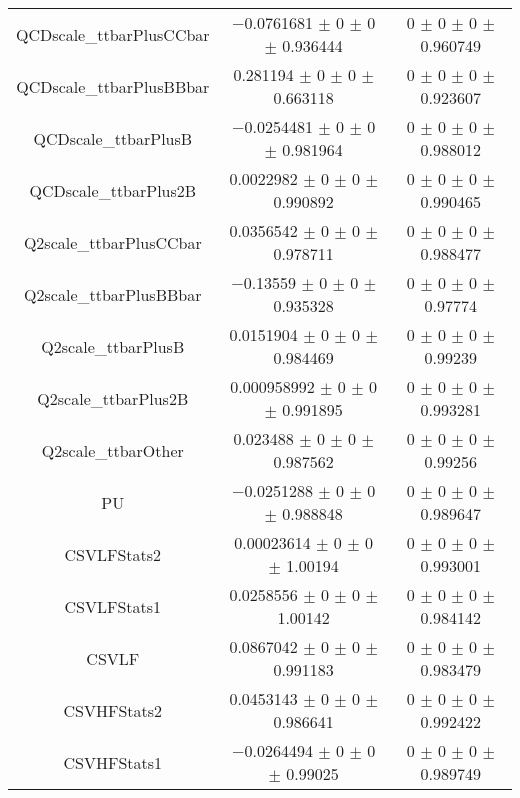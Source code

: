 \begin{table}
\begin{tabular}{ccc}
QCDscale\_ttbarPlusCCbar & \num{-0.0761681} $\pm$ \num{0} $\pm$ \num{0} $\pm$ \num{0.936444} & \num{0} $\pm$ \num{0} $\pm$ \num{0} $\pm$ \num{0.960749}\\
QCDscale\_ttbarPlusBBbar & \num{0.281194} $\pm$ \num{0} $\pm$ \num{0} $\pm$ \num{0.663118} & \num{0} $\pm$ \num{0} $\pm$ \num{0} $\pm$ \num{0.923607}\\
QCDscale\_ttbarPlusB & \num{-0.0254481} $\pm$ \num{0} $\pm$ \num{0} $\pm$ \num{0.981964} & \num{0} $\pm$ \num{0} $\pm$ \num{0} $\pm$ \num{0.988012}\\
QCDscale\_ttbarPlus2B & \num{0.0022982} $\pm$ \num{0} $\pm$ \num{0} $\pm$ \num{0.990892} & \num{0} $\pm$ \num{0} $\pm$ \num{0} $\pm$ \num{0.990465}\\
Q2scale\_ttbarPlusCCbar & \num{0.0356542} $\pm$ \num{0} $\pm$ \num{0} $\pm$ \num{0.978711} & \num{0} $\pm$ \num{0} $\pm$ \num{0} $\pm$ \num{0.988477}\\
Q2scale\_ttbarPlusBBbar & \num{-0.13559} $\pm$ \num{0} $\pm$ \num{0} $\pm$ \num{0.935328} & \num{0} $\pm$ \num{0} $\pm$ \num{0} $\pm$ \num{0.97774}\\
Q2scale\_ttbarPlusB & \num{0.0151904} $\pm$ \num{0} $\pm$ \num{0} $\pm$ \num{0.984469} & \num{0} $\pm$ \num{0} $\pm$ \num{0} $\pm$ \num{0.99239}\\
Q2scale\_ttbarPlus2B & \num{0.000958992} $\pm$ \num{0} $\pm$ \num{0} $\pm$ \num{0.991895} & \num{0} $\pm$ \num{0} $\pm$ \num{0} $\pm$ \num{0.993281}\\
Q2scale\_ttbarOther & \num{0.023488} $\pm$ \num{0} $\pm$ \num{0} $\pm$ \num{0.987562} & \num{0} $\pm$ \num{0} $\pm$ \num{0} $\pm$ \num{0.99256}\\
PU & \num{-0.0251288} $\pm$ \num{0} $\pm$ \num{0} $\pm$ \num{0.988848} & \num{0} $\pm$ \num{0} $\pm$ \num{0} $\pm$ \num{0.989647}\\
CSVLFStats2 & \num{0.00023614} $\pm$ \num{0} $\pm$ \num{0} $\pm$ \num{1.00194} & \num{0} $\pm$ \num{0} $\pm$ \num{0} $\pm$ \num{0.993001}\\
CSVLFStats1 & \num{0.0258556} $\pm$ \num{0} $\pm$ \num{0} $\pm$ \num{1.00142} & \num{0} $\pm$ \num{0} $\pm$ \num{0} $\pm$ \num{0.984142}\\
CSVLF & \num{0.0867042} $\pm$ \num{0} $\pm$ \num{0} $\pm$ \num{0.991183} & \num{0} $\pm$ \num{0} $\pm$ \num{0} $\pm$ \num{0.983479}\\
CSVHFStats2 & \num{0.0453143} $\pm$ \num{0} $\pm$ \num{0} $\pm$ \num{0.986641} & \num{0} $\pm$ \num{0} $\pm$ \num{0} $\pm$ \num{0.992422}\\
CSVHFStats1 & \num{-0.0264494} $\pm$ \num{0} $\pm$ \num{0} $\pm$ \num{0.99025} & \num{0} $\pm$ \num{0} $\pm$ \num{0} $\pm$ \num{0.989749}\\

\end{tabular}
\end{table}
